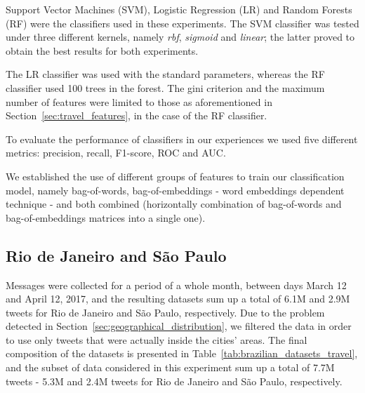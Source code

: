 Support Vector Machines (SVM), Logistic Regression (LR) and Random Forests (RF) were the classifiers used in these experiments. The SVM classifier was tested under three different kernels, namely \textit{rbf}, \textit{sigmoid} and \textit{linear}; the latter proved to obtain the best results for both experiments. 

The LR classifier was used with the standard parameters, whereas the RF classifier used 100 trees in the forest. The gini criterion and the maximum number of features were limited to those as aforementioned in Section~\ref{sec:travel_features}, in the case of the RF classifier.

To evaluate the performance of classifiers in our experiences we used five different metrics: precision, recall, F1-score, ROC and AUC.

We established the use of different groups of features to train our classification model, namely bag-of-words, bag-of-embeddings - word embeddings dependent technique - and both combined (horizontally combination of bag-of-words and bag-of-embeddings matrices into a single one).

\subsection{Rio de Janeiro and São Paulo}
\label{subsec:rio_de_janeiro_sao_paulo_experiment}

Messages were collected for a period of a whole month, between days March 12 and April 12, 2017, and the resulting datasets sum up a total of 6.1M and 2.9M tweets for Rio de Janeiro and São Paulo, respectively. Due to the problem detected in Section~\ref{sec:geographical_distribution}, we filtered the data in order to use only tweets that were actually inside the cities' areas. The final composition of the datasets is presented in Table~\ref{tab:brazilian_datasets_travel}, and the subset of data considered in this experiment sum up a total of 7.7M tweets -  5.3M and 2.4M tweets for Rio de Janeiro and São Paulo, respectively.

